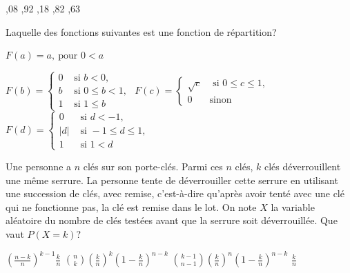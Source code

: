 \begin{questions}
 \begin{oneparcheckboxes}
		,08
		,92
		,18 
		,82
		,63
\end{oneparcheckboxes}

\vspace{0.5cm}

\question[3] Laquelle des fonctions suivantes est une fonction de répartition? 

\begin{checkboxes}
\choice $F(a)=a,\ \mbox{pour } 0 <a$
		
\correctchoice $ F(b) = \left\{
			\begin{array}{ll}
			0  & \mbox{ si } b<0, \\
			b & \mbox{ si } 0\leq b < 1,\\
			1 & \mbox{ si } 1 \leq b
			\end{array}
			\right. $
\choice $ F(c) = \left\{
			\begin{array}{ll}
			\sqrt{c}  & \mbox{ si } 0\leq c\leq 1, \\
			0 & \mbox{sinon}
			\end{array}
			\right. $
\choice $ F(d) = \left\{
			\begin{array}{ll}
			0  & \mbox{ si } d < -1, \\
			|d| & \mbox{ si } -1 \leq d \leq 1,\\
			1 &  \mbox{ si } 1 < d
			\end{array}
			\right. $
\end{checkboxes}



\question[3] Une personne a $n$ clés sur son porte-clés.
Parmi ces $n$ clés, $k$ clés déverrouillent une même serrure. 
La personne tente de déverrouiller cette serrure en utilisant une succession de clés, avec remise, c'est-à-dire qu'après avoir tenté avec une clé qui ne fonctionne pas, la clé est remise dans le lot.
On note $X$ la variable aléatoire du nombre de clés testées avant que la serrure soit déverrouillée.
Que vaut $P(X=k)$?

\begin{oneparcheckboxes}
    \choice $\displaystyle \left(\frac{n-k}{n}\right)^{k-1}\frac{k}{n}$
    \choice $\displaystyle \binom{n}{k}\left(\frac{k}{n}\right)^{k}\left(1-\frac{k}{n}\right)^{n-k}$
    \correctchoice $\displaystyle \binom{k-1}{n-1}\left(\frac{k}{n}\right)^{n}\left(1-\frac{k}{n}\right)^{n-k}$
    \choice $\displaystyle \frac{k}{n}$
\end{oneparcheckboxes}



\end{questions}
